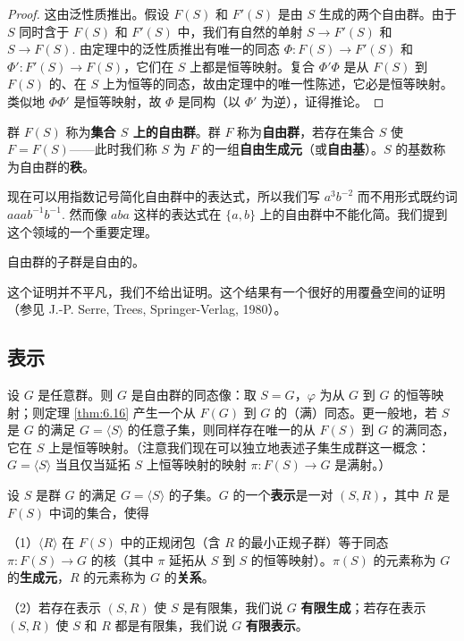 \begin{proof}
这由泛性质推出。假设 \(F(S)\) 和 \(F'(S)\) 是由 \(S\) 生成的两个自由群。由于 \(S\) 同时含于 \(F(S)\) 和 \(F'(S)\) 中，我们有自然的单射 \(S \to F'(S)\) 和 \(S \to F(S)\). 由定理中的泛性质推出有唯一的同态 \(\Phi : F(S) \to F'(S)\) 和 \(\Phi' : F'(S) \to F(S)\)，它们在 \(S\) 上都是恒等映射。复合 \(\Phi'\Phi\) 是从 \(F(S)\) 到 \(F(S)\) 的、在 \(S\) 上为恒等的同态，故由定理中的唯一性陈述，它必是恒等映射。类似地 \(\Phi\Phi'\) 是恒等映射，故 \(\Phi\) 是同构（以 \(\Phi'\) 为逆），证得推论。
\end{proof}

\begin{definition}
群 \(F(S)\) 称为\textbf{集合 \(S\) 上的自由群}。群 \(F\) 称为\textbf{自由群}，若存在集合 \(S\) 使 \(F = F(S)\)——此时我们称 \(S\) 为 \(F\) 的一组\textbf{自由生成元}（或\textbf{自由基}）。\(S\) 的基数称为自由群的\textbf{秩}。
\end{definition}

现在可以用指数记号简化自由群中的表达式，所以我们写 \(a^3b^{-2}\) 而不用形式既约词 \(aaab^{-1}b^{-1}\). 然而像 \(aba\) 这样的表达式在 \(\{a, b\}\) 上的自由群中不能化简。我们提到这个领域的一个重要定理。

\begin{theorem}[施赖埃尔]\label{thm:6.19}
自由群的子群是自由的。
\end{theorem}

这个证明并不平凡，我们不给出证明。这个结果有一个很好的用覆叠空间的证明（参见 J.-P. Serre, Trees, Springer-Verlag, 1980）。

\subsection*{表示}

设 \(G\) 是任意群。则 \(G\) 是自由群的同态像：取 \(S = G\)，\(\varphi\) 为从 \(G\) 到 \(G\) 的恒等映射；则定理 \ref{thm:6.16} 产生一个从 \(F(G)\) 到 \(G\) 的（满）同态。更一般地，若 \(S\) 是 \(G\) 的满足 \(G = \langle S \rangle\) 的任意子集，则同样存在唯一的从 \(F(S)\) 到 \(G\) 的满同态，它在 \(S\) 上是恒等映射。（注意我们现在可以独立地表述子集生成群这一概念：\(G = \langle S \rangle\) 当且仅当延拓 \(S\) 上恒等映射的映射 \(\pi : F(S) \to G\) 是满射。）

\begin{definition}
设 \(S\) 是群 \(G\) 的满足 \(G = \langle S \rangle\) 的子集。\(G\) 的一个\textbf{表示}是一对 \((S, R)\)，其中 \(R\) 是 \(F(S)\) 中词的集合，使得

（1）\(\langle R \rangle\) 在 \(F(S)\) 中的正规闭包（含 \(R\) 的最小正规子群）等于同态 \(\pi : F(S) \to G\) 的核（其中 \(\pi\) 延拓从 \(S\) 到 \(S\) 的恒等映射）。\(\pi(S)\) 的元素称为 \(G\) 的\textbf{生成元}，\(R\) 的元素称为 \(G\) 的\textbf{关系}。

（2）若存在表示 \((S, R)\) 使 \(S\) 是有限集，我们说 \(G\) \textbf{有限生成}；若存在表示 \((S, R)\) 使 \(S\) 和 \(R\) 都是有限集，我们说 \(G\) \textbf{有限表示}。
\end{definition}

